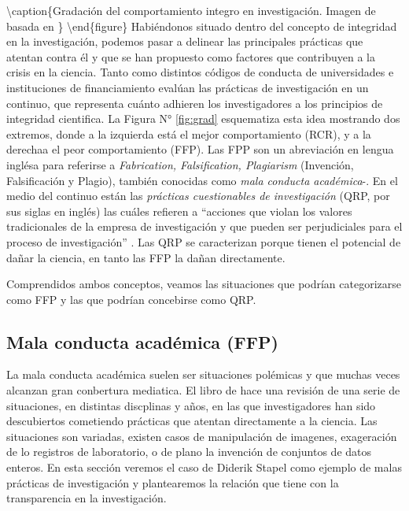 \documentclass[
]{book}
\begin{document}
\textbackslash caption\{Gradación del comportamiento integro en investigación. Imagen de \citet{abrilruiz_Manzanas_2019} basada en \citet{steneck_Fostering_2006}\}\label{fig:grad}
\textbackslash end\{figure\}
Habiéndonos situado dentro del concepto de integridad en la investigación, podemos pasar a delinear las principales prácticas que atentan contra él y que se han propuesto como factores que contribuyen a la crisis en la ciencia. Tanto \citet{steneck_Fostering_2006} como distintos códigos de conducta de universidades e instituciones de financiamiento \citep[ver][]{abrilruiz_Manzanas_2019} evalúan las prácticas de investigación en un continuo, que representa cuánto adhieren los investigadores a los principios de integridad cientifica. La Figura N° \ref{fig:grad} esquematiza esta idea mostrando dos extremos, donde a la izquierda está el mejor comportamiento (RCR), y a la derechaa el peor comportamiento (FFP). Las FPP son un abreviación en lengua inglésa para referirse a \emph{Fabrication, Falsification, Plagiarism} (Invención, Falsificación y Plagio), también conocidas como \emph{mala conducta académica}-. En el medio del continuo están las \emph{prácticas cuestionables de investigación} (QRP, por sus siglas en inglés) las cuáles refieren a ``acciones que violan los valores tradicionales de la empresa de investigación y que pueden ser perjudiciales para el proceso de investigación'' \citep[\emph{National Academies of Science} 1992 en][p.58]{steneck_Fostering_2006}. Las QRP se caracterizan porque tienen el potencial de dañar la ciencia, en tanto las FFP la dañan directamente.

Comprendidos ambos conceptos, veamos las situaciones que podrían categorizarse como FFP y las que podrían concebirse como QRP.

\hypertarget{mala-conducta-acaduxe9mica-ffp}{%
\subsection{Mala conducta académica (FFP)}\label{mala-conducta-acaduxe9mica-ffp}}

La mala conducta académica suelen ser situaciones polémicas y que muchas veces alcanzan gran conbertura mediatica. El libro de \citet{abrilruiz_Manzanas_2019} hace una revisión de una serie de situaciones, en distintas discplinas y años, en las que investigadores han sido descubiertos cometiendo prácticas que atentan directamente a la ciencia. Las situaciones son variadas, existen casos de manipulación de imagenes, exageración de lo registros de laboratorio, o de plano la invención de conjuntos de datos enteros. En esta sección veremos el caso de Diderik Stapel como ejemplo de malas prácticas de investigación y plantearemos la relación que tiene con la transparencia en la investigación.
\end{document}
